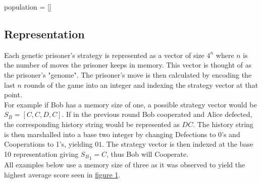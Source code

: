 \documentclass[12pt]{article}
\begin{document}
\begin{algorithm}[H]
 population = [] \;
\end{algorithm}

\subsection{Representation}
Each genetic prisoner's strategy is represented as a vector of size
$4^n$ where $n$ is the number of moves the prisoner keeps in memory.  This vector
is thought of as the prisoner's "genome".
The prisoner's move is then calculated by encoding the last $n$ rounds of the game
into an integer and indexing the strategy vector at that point. \\

For example if Bob has
a memory size of one, a possible strategy vector would be
$S_B = [C, C, D, C]$.  If in the previous round Bob cooperated and Alice defected,
the corresponding history string would be represented as $DC$.
The history string is then
marshalled into a base two integer by changing Defections to 0's and Cooperations
to 1's, yielding $01$.  The strategy vector is then indexed at the base
10 representation giving ${S_B}_1 = C$, thus Bob will Cooperate. \\

All examples below use a memory size of three as it was observed to yield the
highest average score seen in \hyperref[fig1]{figure 1}.

\pagebreak
\end{document}
